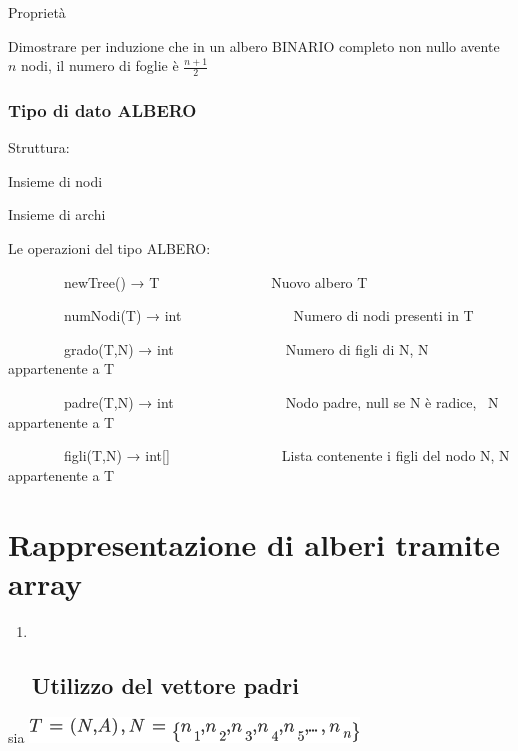 \documentclass{article}
\begin{document}
{Proprietà}

{Dimostrare per induzione che in un albero BINARIO completo non nullo avente $n$ nodi, il numero di foglie è $\frac{n+1}{2}$}

\hypertarget{h.8kg49eb4dpz1}{\subsubsection{\texorpdfstring{{Tipo di dato ALBERO}}{Tipo di dato ALBERO}}\label{h.8kg49eb4dpz1}}


{Struttura:}

{Insieme di nodi}

{Insieme di archi}


{Le operazioni del tipo ALBERO:}


{~~~~~~~~newTree() → T~~~~~~~~~~~~~~~~Nuovo albero T}

{~~~~~~~~numNodi(T) → int~~~~~~~~~~~~~~~~Numero di nodi presenti in T}

{~~~~~~~~grado(T,N) → int~~~~~~~~~~~~~~~~Numero di figli di N, N
appartenente a T}

{~~~~~~~~padre(T,N) → int~~~~~~~~~~~~~~~~Nodo padre, null se N è radice,
~N appartenente a T}

{~~~~~~~~figli(T,N) → int{[}{]}~~~~~~~~~~~~~~~~Lista contenente i figli
del nodo N, N appartenente a T}

{}

\hypertarget{h.ueuovjwdu9zj}{\section{\texorpdfstring{{Rappresentazione
di alberi tramite
array}}{Rappresentazione di alberi tramite array}}\label{h.ueuovjwdu9zj}}

{}

\begin{enumerate}
\item ~
  \hypertarget{h.nrzs3ooed9o}{\subsection{\texorpdfstring{{Utilizzo del
  vettore padri}}{Utilizzo del vettore padri}}\label{h.nrzs3ooed9o}}
\end{enumerate}

{}

{}

{}

{}

{sia }\includegraphics{images/image100.png}
\end{document}
